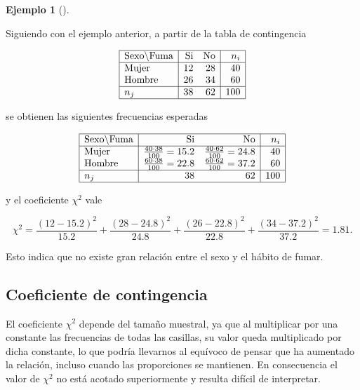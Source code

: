 \documentclass[
  spanish,
  a4paper,
]{scrreport}
\theoremstyle{plain}
\theoremstyle{definition}
\newtheorem{example}{Ejemplo}[chapter]
\theoremstyle{definition}
\theoremstyle{remark}
\begin{document}
\begin{example}[]\protect\hypertarget{exm-coeficiente-chi-cuadrado}{}\label{exm-coeficiente-chi-cuadrado}

Siguiendo con el ejemplo anterior, a partir de la tabla de contingencia

\[
\begin{array}{|l|rr|r|}
\hline
\mbox{Sexo}\backslash\mbox{Fuma} & \mbox{Si} & \mbox{No} & n_i\\
\hline
\mbox{Mujer} & 12 & 28 & 40 \\
\mbox{Hombre} & 26 & 34 & 60 \\
\hline
n_j & 38 & 62 & 100\\
\hline
\end{array}
\]

se obtienen las siguientes frecuencias esperadas

\[
\begin{array}{|l|rr|r|}
\hline
\mbox{Sexo}\backslash\mbox{Fuma} & \mbox{Si} & \mbox{No} & n_i\\
\hline
\mbox{Mujer} & \frac{40\cdot 38}{100}=15.2 & \frac{40\cdot 62}{100}=24.8 & 40 \\
\mbox{Hombre} & \frac{60\cdot 38}{100}=22.8 & \frac{60\cdot 62}{100}=37.2 & 60 \\
\hline
n_j & 38 & 62 & 100\\
\hline
\end{array}
\]

y el coeficiente \(\chi^2\) vale

\[\chi^2 = \frac{(12-15.2)^2}{15.2}+\frac{(28-24.8)^2}{24.8}+\frac{(26-22.8)^2}{22.8}+\frac{(34-37.2)^2}{37.2} = 1.81.\]

Esto indica que no existe gran relación entre el sexo y el hábito de
fumar.

\end{example}

\subsection{Coeficiente de
contingencia}\label{coeficiente-de-contingencia}

El coeficiente \(\chi^2\) depende del tamaño muestral, ya que al
multiplicar por una constante las frecuencias de todas las casillas, su
valor queda multiplicado por dicha constante, lo que podría llevarnos al
equívoco de pensar que ha aumentado la relación, incluso cuando las
proporciones se mantienen. En consecuencia el valor de \(\chi^2\) no
está acotado superiormente y resulta difícil de interpretar.
\end{document}
